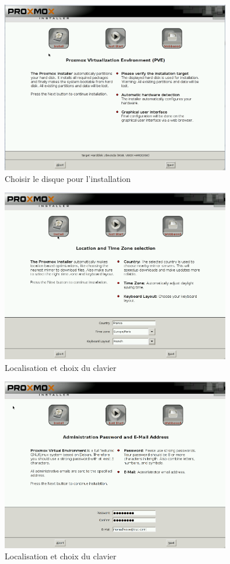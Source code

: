 \documentclass[12pt,a4paper]{article}
\begin{document}
\begin{figure}[!ht]
\center
\includegraphics[width=10cm]{Images/3.PNG}  
\caption{Choisir le disque pour l'installation}
\end{figure}


\begin{figure}[!ht]
\center
\includegraphics[width=10cm]{Images/4.PNG}  
\caption{Localisation et choix du clavier}
\end{figure}
\newpage
\begin{figure}[!ht]
\center
\includegraphics[width=10cm]{Images/5.PNG}  
\caption{Localisation et choix du clavier}
\end{figure}
\end{document}
